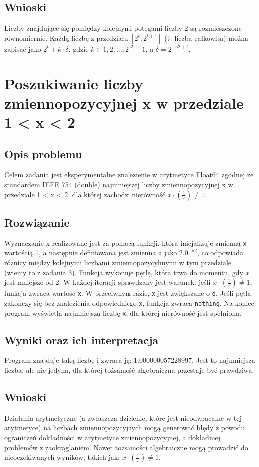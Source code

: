 \documentclass{article}
\begin{document}
\subsection{Wnioski}
Liczby znajdujące się pomiędzy kolejnymi potęgami liczby 2 są rozmieszczone równomiernie. Każdą liczbę z przedziału $[2^t, 2^{t+1}]$ (t- liczba całkowita) można zapisać jako $2^t + k\cdot \delta$, gdzie $k \in {1, 2, \dots, 2^{52} - 1}$, a $\delta = 2^{-52+t}$.
\section{Poszukiwanie liczby zmiennopozycyjnej x w przedziale 1 < x < 2}
\subsection{Opis problemu}
Celem zadania jest eksperymentalne znalezienie w arytmetyce Float64 zgodnej ze standardem IEEE 754 (double) najmniejszej liczby zmiennopozycyjnej x w przedziale 1 < x < 2, dla której zachodzi nierówność $x \cdot \left( \frac{1}{x} \right) \neq 1$.

\subsection{Rozwiązanie}
Wyznaczanie x realizowane jest za pomocą funkcji, która inicjalizuje zmienną \texttt{x} wartością 1, a następnie definiowana jest zmienna \texttt{d} jako \( 2.0^{-52} \), co odpowiada różnicy między kolejnymi liczbami zmiennopozycyhnymi w tym przedziale (wiemy to z zadania 3). Funkcja wykonuje pętlę, która trwa do momentu, gdy \( x \) jest mniejsze od 2. W każdej iteracji sprawdzany jest warunek: jeśli $x \cdot \left( \frac{1}{x} \right) \neq 1$, funkcja zwraca wartość \texttt{x}. W przeciwnym razie, \texttt{x} jest zwiększane o \texttt{d}. Jeśli pętla zakończy się bez znalezienia odpowiedniego \texttt{x}, funkcja zwraca \texttt{nothing}. Na koniec program wyświetla najmniejszą liczbę \texttt{x}, dla której nierówność jest spełniona.
\subsection{Wyniki oraz ich interpretacja}
Program znajduje taką liczbę i zwraca ją: 1.000000057228997. Jest to najmniejsza liczba, ale nie jedyna, dla której tożsamość algebraiczna przestaje być prawdziwa.
\subsection{Wnioski}
Działania arytmetyczne (a zwłaszcza dzielenie, które jest nieodwracalne w tej arytmetyce) na liczbach zmiennopozycyjnych mogą generować błędy z powodu ograniczeń dokładności w arytmetyce zmiennopozycyjnej, a dokładniej problemów z zaokrąglaniem. Nawet tożsamości algebraiczne mogą prowadzić do nieoczekiwanych wyników, takich jak: $x \cdot \left( \frac{1}{x} \right) \neq 1$.
\end{document}
